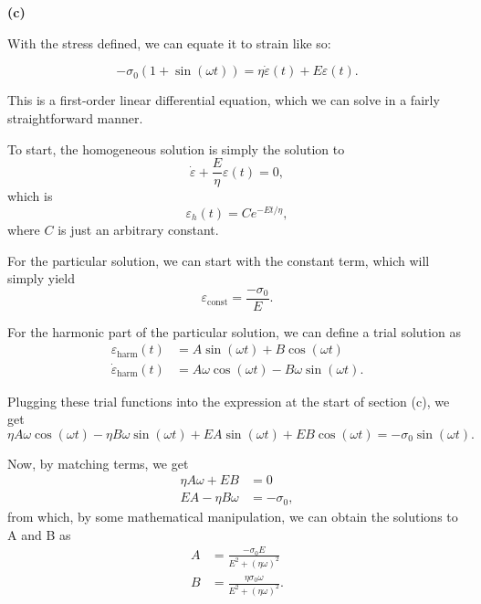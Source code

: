 \textbf{(c)}

With the stress defined, we can equate it to strain like so:

\begin{equation*}
    -\sigma_0 (1 + \sin(\omega t)) = \eta \dot \varepsilon (t) + E \varepsilon (t).
\end{equation*}

This is a first-order linear differential equation, which we can solve in a fairly straightforward manner.

To start, the homogeneous solution is simply the solution to
\begin{equation*}
    \dot \varepsilon + \frac{E}{\eta} \varepsilon(t) = 0,
\end{equation*}
which is
\begin{equation*}
    \varepsilon_h (t) = C e^{-Et/\eta},
\end{equation*}
where $C$ is just an arbitrary constant.

For the particular solution, we can start with the constant term, which will simply yield
\begin{equation*}
    \varepsilon_{\mathrm{const}} = \frac{-\sigma_0}{E}.
\end{equation*}

For the harmonic part of the particular solution, we can define a trial solution as
\begin{align*}
    \varepsilon_{\mathrm{harm}} (t) &= A\sin(\omega t) + B\cos(\omega t)\\
    \dot \varepsilon_{\mathrm{harm}} (t) &= A\omega\cos(\omega t) - B\omega\sin(\omega t).
\end{align*}

Plugging these trial functions into the expression at the start of section (c), we get
\begin{equation*}
    \eta A \omega \cos(\omega t) - \eta B \omega \sin(\omega t) + EA\sin(\omega t) + EB\cos(\omega t) = -\sigma_0 \sin(\omega t).
\end{equation*}

Now, by matching terms, we get
\begin{align*}
    \eta A \omega + EB &= 0\\
    EA - \eta B \omega &= -\sigma_0,
\end{align*}
 from which, by some mathematical manipulation, we can obtain the solutions to A and B as
 \begin{align*}
     A &= \frac{-\sigma_0 E}{E^2 + (\eta \omega)^2}\\
     B &= \frac{\eta \sigma_0 \omega}{E^2 + (\eta \omega)^2}.
 \end{align*}

